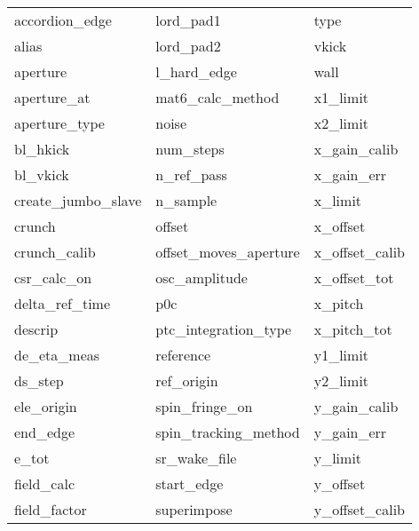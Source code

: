  \begin{tabular}{lll} \toprule
accordion_edge              & lord_pad1                   & type                        \\
alias                       & lord_pad2                   & vkick                       \\
aperture                    & l_hard_edge                 & wall                        \\
aperture_at                 & mat6_calc_method            & x1_limit                    \\
aperture_type               & noise                       & x2_limit                    \\
bl_hkick                    & num_steps                   & x_gain_calib                \\
bl_vkick                    & n_ref_pass                  & x_gain_err                  \\
create_jumbo_slave          & n_sample                    & x_limit                     \\
crunch                      & offset                      & x_offset                    \\
crunch_calib                & offset_moves_aperture       & x_offset_calib              \\
csr_calc_on                 & osc_amplitude               & x_offset_tot                \\
delta_ref_time              & p0c                         & x_pitch                     \\
descrip                     & ptc_integration_type        & x_pitch_tot                 \\
de_eta_meas                 & reference                   & y1_limit                    \\
ds_step                     & ref_origin                  & y2_limit                    \\
ele_origin                  & spin_fringe_on              & y_gain_calib                \\
end_edge                    & spin_tracking_method        & y_gain_err                  \\
e_tot                       & sr_wake_file                & y_limit                     \\
field_calc                  & start_edge                  & y_offset                    \\
field_factor                & superimpose                 & y_offset_calib              \\

\end{tabular}
